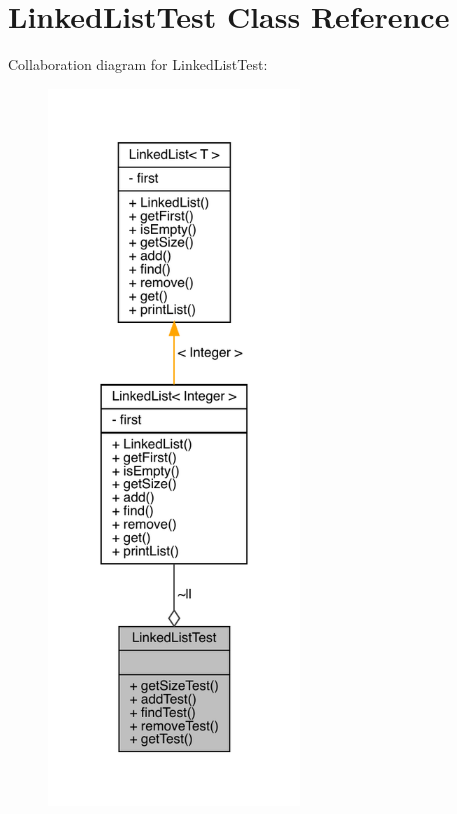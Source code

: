 \hypertarget{class_linked_list_test}{}\section{Linked\+List\+Test Class Reference}
\label{class_linked_list_test}


Collaboration diagram for Linked\+List\+Test\+:
\nopagebreak
\begin{figure}[H]
\begin{center}
\leavevmode
\includegraphics[width=189pt]{class_linked_list_test__coll__graph}
\end{center}
\end{figure}
